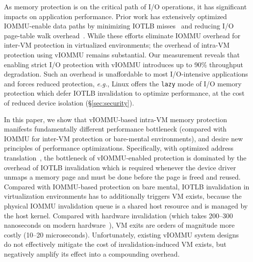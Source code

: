 As memory protection is on the critical path of I/O operations,
    it has significant impacts on application performance.
Prior work has extensively optimized IOMMU-enable data paths by 
    minimizing IOTLB misses~\cite{?} and 
    reducing I/O page-table walk overhead~\cite{Rubin2024FastSafe,markuze2018damn}.
While these efforts eliminate IOMMU overhead 
    for inter-VM protection in virtualized environments;
    the overhead of intra-VM protection using vIOMMU remains substantial.
Our measurement  
    reveals that enabling strict I/O protection with vIOMMU 
    introduces up to 90\% throughput degradation.
Such an overhead is unaffordable to most I/O-intensive applications
    and forces reduced protection, \textit{e.g.}, 
    Linux offers the \texttt{lazy} mode of I/O memory protection
    which defer IOTLB invalidation to optimize performance,
    at the cost of reduced device isolation (\S\ref{sec:security}).

In this paper, we show that
    vIOMMU-based intra-VM memory protection manifests fundamentally different
    performance bottleneck (compared with 
    IOMMU for inter-VM protection or bare-mental environments),
    and desire new principles of performance optimizations.
Specifically, with optimized address
    translation~\cite{Rubin2024FastSafe,markuze2018damn},
    the bottleneck of vIOMMU-enabled protection is dominated by the overhead of
    IOTLB invalidation which is required whenever the device driver unmaps a memory page
    and must be done before the page is freed and reused.
Compared with IOMMU-based protection on bare mental,
    IOTLB invalidation in virtualization environments has to additionally
    triggers VM exists, because the physical IOMMU invalidation queue is a shared host resource
    and is managed by the host kernel.
Compared with hardware invalidation (which
    takes 200--300 nanoseconds on modern hardware~\cite{Rubin2024FastSafe}),
    VM exits are orders of magnitude more costly (10--20 microseconds).
Unfortunately, existing vIOMMU system designs~\cite{Amit2011vIOMMU,Tian2020coIOMMU,linux} 
    do not effectively mitigate the cost of invalidation-induced VM exists, 
    but negatively amplify its effect into a compounding overhead.

